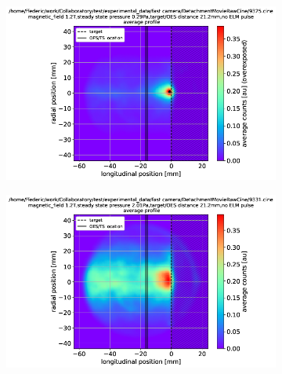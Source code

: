 \begin{figure}[!ht]
     \centering
     \begin{subfigure}{0.35\textwidth}
         \centering
         \vspace*{-0mm}
         \includegraphics[width=\textwidth,trim={26 0 17 11},clip]{Chapters/chapter3/figs/fast_camera_9325.cine.png}
         \vspace*{-17mm}
         {\color{white}\caption{\phantom{weww}}\label{fig:SSa}}
     \end{subfigure}
     \hfill
     \begin{subfigure}{0.31\textwidth}
         \centering
         \vspace*{-0mm}
         \includegraphics[width=\textwidth,trim={39 0 17 11},clip]{Chapters/chapter3/figs/fast_camera_9331.cine.png}
         \vspace*{-17mm}
         {\color{white}\caption{\phantom{wewwwww}}\label{fig:SSb}}

\end{subfigure}
\end{figure}
